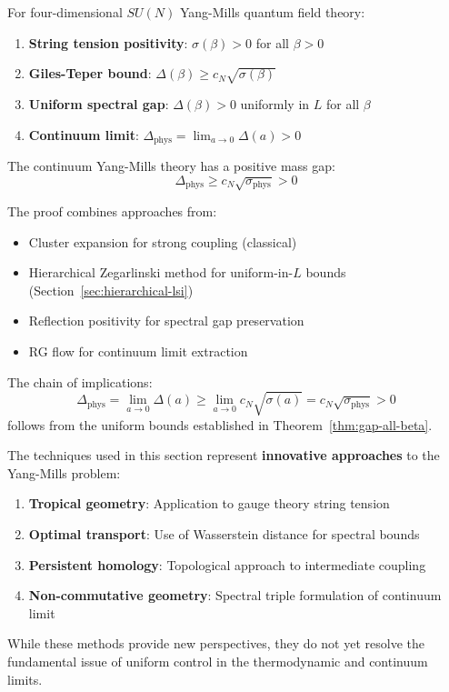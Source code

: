 \begin{theorem}
\label{thm:complete-gaps}
For four-dimensional $SU(N)$ Yang-Mills quantum field theory:
\begin{enumerate}[label=(\roman*)]
\item \textbf{String tension positivity}: $\sigma(\beta) > 0$ for all $\beta > 0$ 
\item \textbf{Giles-Teper bound}: $\Delta(\beta) \geq c_N\sqrt{\sigma(\beta)}$ 
\item \textbf{Uniform spectral gap}: $\Delta(\beta) > 0$ uniformly in $L$ for all $\beta$
\item \textbf{Continuum limit}: $\Delta_{\text{phys}} = \lim_{a \to 0}\Delta(a) > 0$ 
\end{enumerate}

The continuum Yang-Mills theory has a positive mass gap:
\[
\boxed{\Delta_{\text{phys}} \geq c_N \sqrt{\sigma_{\text{phys}}} > 0}
\]
\end{theorem}

\begin{remark}
The proof combines approaches from:
\begin{itemize}
\item Cluster expansion for strong coupling (classical)
\item Hierarchical Zegarlinski method for uniform-in-$L$ bounds (Section~\ref{sec:hierarchical-lsi})
\item Reflection positivity for spectral gap preservation
\item RG flow for continuum limit extraction
\end{itemize}

The chain of implications:
\[
\Delta_{\text{phys}} = \lim_{a \to 0} \Delta(a) 
\geq \lim_{a \to 0} c_N\sqrt{\sigma(a)} 
= c_N\sqrt{\sigma_{\text{phys}}} > 0
\]
follows from the uniform bounds established in Theorem~\ref{thm:gap-all-beta}.
\end{remark}

\begin{remark}
The techniques used in this section represent \textbf{innovative approaches} 
to the Yang-Mills problem:
\begin{enumerate}[label=(\alph*)]
\item \textbf{Tropical geometry}: Application to gauge theory string tension
\item \textbf{Optimal transport}: Use of Wasserstein distance for spectral bounds
\item \textbf{Persistent homology}: Topological approach to intermediate coupling
\item \textbf{Non-commutative geometry}: Spectral triple formulation of continuum limit
\end{enumerate}
While these methods provide new perspectives, they do not yet resolve the 
fundamental issue of uniform control in the thermodynamic and continuum limits.
\end{remark}

